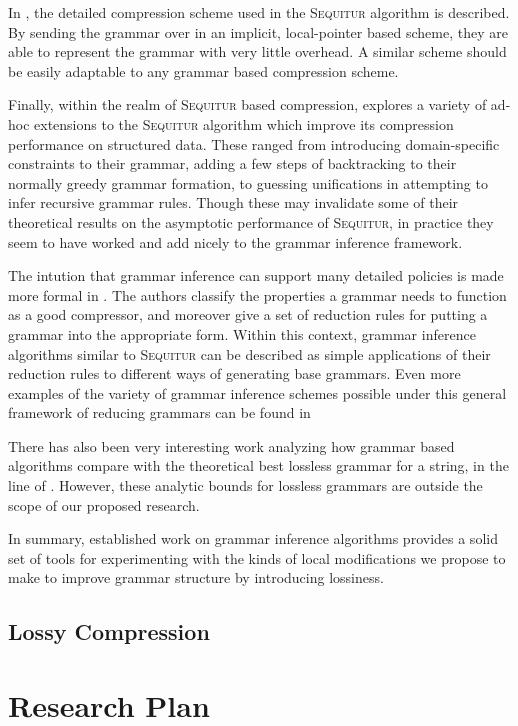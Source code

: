 \documentclass[11pt]{article}
\newcommand{\Sequitur}{\textsc{Sequitur}\xspace}
\begin{document}
In \cite{sequitur2}, the detailed compression scheme used in the \Sequitur
algorithm is described.  By sending the grammar over in an implicit,
local-pointer based scheme, they are able to represent the grammar with very
little overhead.  A similar scheme should be easily adaptable to any grammar
based compression scheme.

Finally, within the realm of \Sequitur based compression, \cite{nevillphd}
explores a variety of ad-hoc extensions to the \Sequitur algorithm which
improve its compression performance on structured data.  These ranged from
introducing domain-specific constraints to their grammar, adding a few steps of
backtracking to their normally greedy grammar formation, to guessing
unifications in attempting to infer recursive grammar rules.  Though these may
invalidate some of their theoretical results on the asymptotic performance of
\Sequitur, in practice they seem to have worked and add nicely to the grammar
inference framework.

The intution that grammar inference can support many detailed policies is made
more formal in \cite{grammarcodes}.  The authors classify the properties a
grammar needs to function as a good compressor, and moreover give a set of
reduction rules for putting a grammar into the appropriate form.  Within this
context, grammar inference algorithms similar to \Sequitur can be described as
simple applications of their reduction rules to different ways of generating
base grammars.  Even more examples of the variety of grammar inference schemes
possible under this general framework of reducing grammars can be found in
\cite{efficientgreedy}

There has also been very interesting work analyzing how grammar based
algorithms compare with the theoretical best lossless grammar for a string, in
the line of \cite{approximation}.  However, these analytic bounds for lossless
grammars are outside the scope of our proposed research.

In summary, established work on grammar inference algorithms provides a solid
set of tools for experimenting with the kinds of local modifications we propose
to make to improve grammar structure by introducing lossiness.

\subsection{Lossy Compression}

\section{Research Plan}
\end{document}

